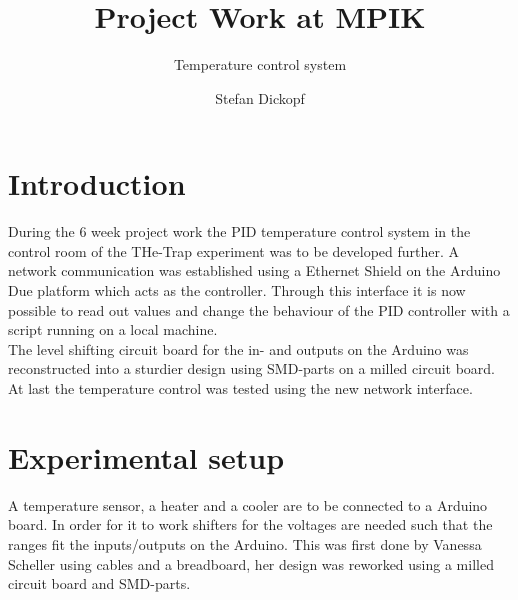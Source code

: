 \documentclass[12pt]{scrartcl}
\begin{document}
  \title{Project Work at MPIK}
  \subtitle{Temperature control system}
  \date{}
  \author{Stefan Dickopf}
  \maketitle

  \section{Introduction}
    During the 6 week project work the PID temperature control system in the
    control room of the THe-Trap experiment was to be developed further. A
    network communication was established using a Ethernet Shield on
    the Arduino Due platform which acts as the controller. Through this
    interface it is now possible to read out values and change the behaviour
    of the PID controller with a script running on a local machine.\\
    The level shifting circuit board for the in- and outputs on the Arduino
    was reconstructed into a sturdier design using SMD-parts on a milled
    circuit board.\\
    At last the temperature control was tested using the new network interface.

  \section{Experimental setup}
    A temperature sensor, a heater and a cooler are to be connected to a Arduino
    board. In order for it to work shifters for the voltages are needed such that the
    ranges fit the inputs/outputs on the Arduino. This was first done by
    Vanessa Scheller using cables and a breadboard, her design was reworked
    using a milled circuit board and SMD-parts.
\end{document}
